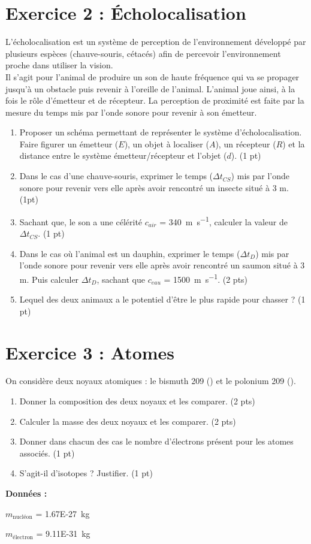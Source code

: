 \documentclass[a4paper,12pt]{article}
\newenvironment{itemize*}%
{\begin{itemize}[label=$-$]%
		\setlength{\itemsep}{0pt}%
		\setlength{\parskip}{0pt}}%
	{\end{itemize}}
\begin{document}
\section*{Exercice 2 : Écholocalisation}
L'écholocalisation est un système de perception de l'environnement développé par plusieurs espèces (chauve-souris, cétacés) afin de percevoir l'environnement proche dans utiliser la vision.\\
Il s'agit pour l'animal de produire un son de haute fréquence qui va se propager jusqu'à un obstacle puis revenir à l'oreille de l'animal. L'animal joue ainsi, à la fois le rôle d'émetteur et de récepteur. La perception de proximité est faite par la mesure du temps mis par l'onde sonore pour revenir à son émetteur.
\begin{enumerate}
	\item Proposer un schéma permettant de représenter le système d'écholocalisation. Faire figurer un émetteur ($E$), un objet à localiser ($A$), un récepteur ($R$) et la distance entre le système émetteur/récepteur et l'objet ($d$). (1 pt)
	\item Dans le cas d'une chauve-souris, exprimer le temps ($\Delta t_{CS}$) mis par l'onde sonore pour revenir vers elle après avoir rencontré un insecte situé à 3 m. (1pt)
	\item Sachant que, le son a une célérité $c_{air}$ = \SI{340}{\meter\per\second}, calculer la valeur de $\Delta t_{CS}$. (1 pt)
	\item Dans le cas où l'animal est un dauphin, exprimer le temps ($\Delta t_{D}$) mis par l'onde sonore pour revenir vers elle après avoir rencontré un saumon situé à 3 m. Puis calculer $\Delta t_{D}$, sachant que $c_{eau}$ = \SI{1500}{\meter\per\second}. (2 pts)
	\item Lequel des deux animaux a le potentiel d'être le plus rapide pour chasser ? (1 pt)
\end{enumerate}

\section*{Exercice 3 : Atomes}
On considère deux noyaux atomiques : le bismuth 209 () et le polonium 209 ().
\begin{enumerate}
	\item Donner la composition des deux noyaux et les comparer. (2 pts)
	\item Calculer la masse des deux noyaux et les comparer.  (2 pts)
	\item Donner dans chacun des cas le nombre d'électrons présent pour les atomes associés.  (1 pt)
	\item S'agit-il d'isotopes ? Justifier.  (1 pt)
\end{enumerate}

\textbf{Données :}
\begin{itemize*}
	\item $m_{\text{nucléon}}$ = \SI{1.67E-27}{kg}
	\item $m_{\text{électron}}$ = \SI{9.11E-31}{kg}
\end{itemize*}
\end{document}
